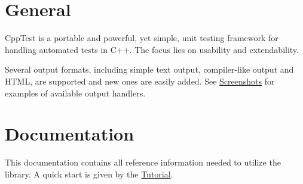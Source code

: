 \hypertarget{index_main_general}{}\section{General}\label{index_main_general}
Cpp\+Test is a portable and powerful, yet simple, unit testing framework for handling automated tests in C++. The focus lies on usability and extendability.

Several output formats, including simple text output, compiler-\/like output and H\+T\+ML, are supported and new ones are easily added. See \hyperlink{tutorial_tutorial_screenshots}{Screenshots} for examples of available output handlers.\hypertarget{index_main_documentation}{}\section{Documentation}\label{index_main_documentation}
This documentation contains all reference information needed to utilize the library. A quick start is given by the \hyperlink{tutorial}{Tutorial}.

